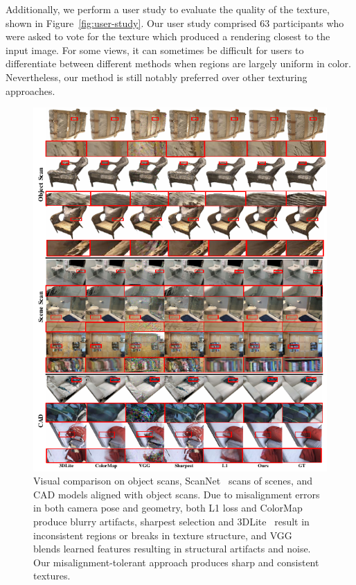 Additionally, we perform a user study to evaluate the quality of the texture, shown in Figure~\ref{fig:user-study}.
Our user study comprised $63$ participants who were asked to vote for the texture which produced a rendering closest to the input image. 
For some views, it can sometimes be difficult for users to differentiate between different methods when regions are largely uniform in color. 
Nevertheless, our method is still notably preferred over other texturing approaches.
\begin{figure}
    \centering
    \includegraphics[width=\linewidth,height=1.15\linewidth]{texturegen/figures/result.pdf}
    \caption{Visual comparison on object scans, ScanNet~\cite{dai2017scannet} scans of scenes, and CAD models aligned with object scans. Due to misalignment errors in both camera pose and geometry, both L1 loss and ColorMap~\cite{zhou2014color} produce blurry artifacts, sharpest selection and 3DLite~\cite{huang20173dlite} result in inconsistent regions or breaks in texture structure, and VGG~\cite{johnson2016perceptual} blends learned features resulting in structural artifacts and noise. Our misalignment-tolerant approach produces sharp and consistent textures.}
    \label{fig:toptim-object-scan}
\end{figure}